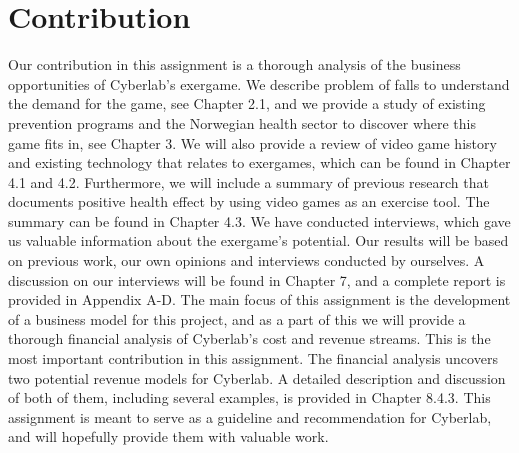 \section{Contribution}
Our contribution in this assignment is a thorough analysis of the business opportunities of Cyberlab’s exergame. We describe problem of falls to understand the demand for the game, see Chapter 2.1, and we provide a study of existing prevention programs and the Norwegian health sector to discover where this game fits in, see Chapter 3. We will also provide a review of video game history and existing technology that relates to exergames, which can be found in Chapter 4.1 and 4.2. Furthermore, we will include a summary of previous research that documents positive health effect by using video games as an exercise tool. The summary can be found in Chapter 4.3. We have conducted interviews, which gave us valuable information about the exergame’s potential. Our results will be based on previous work, our own opinions and interviews conducted by ourselves. A discussion on our interviews will be found in Chapter 7, and a complete report is provided in Appendix A-D. The main focus of this assignment is the development of a business model for this project, and as a part of this we will provide a thorough financial analysis of Cyberlab’s cost and revenue streams. This is the most important contribution in this assignment. The financial analysis uncovers two potential revenue models for Cyberlab. A detailed description and discussion of both of them, including several examples, is provided in Chapter 8.4.3. This assignment is meant to serve as a guideline and recommendation for Cyberlab, and will hopefully provide them with valuable work.

